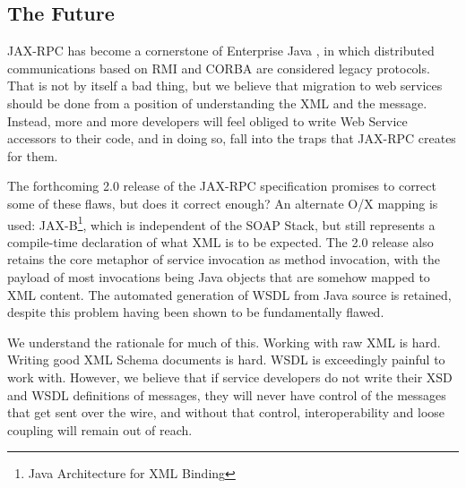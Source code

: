 
\subsection{The Future}
\label{objections:implications:future}

JAX-RPC has become a cornerstone of Enterprise Java \cite{spec:J2EE-14}, in
which distributed communications based on RMI and CORBA are considered
legacy protocols. That is not by itself a bad thing, but we believe
that migration to web services should be done from a position of
understanding the XML and the message. Instead, more and more
developers will feel obliged to write Web Service accessors to their
code, and in doing so, fall into the traps that JAX-RPC creates for
them.

The forthcoming 2.0 release of the JAX-RPC specification promises to
correct some of these flaws, but does it correct enough? An alternate
O/X mapping is used: JAX-B\footnote{Java Architecture for XML
Binding}, which is independent of the SOAP Stack, but still represents
a compile-time declaration of what XML is to be expected. The 2.0
release also retains the core metaphor of service invocation as method
invocation, with the payload of most invocations being Java objects
that are somehow mapped to XML content. The automated generation of
WSDL from Java source is retained, despite this problem having been
shown to be fundamentally flawed.

We understand the rationale for much of this. Working with raw XML is
hard.  Writing good XML Schema documents is hard. WSDL is exceedingly
painful to work with. However, we believe that if service developers
do not write their XSD and WSDL definitions of messages, they will
never have control of the messages that get sent over the wire, and
without that control, interoperability and loose coupling will remain
out of reach.  

